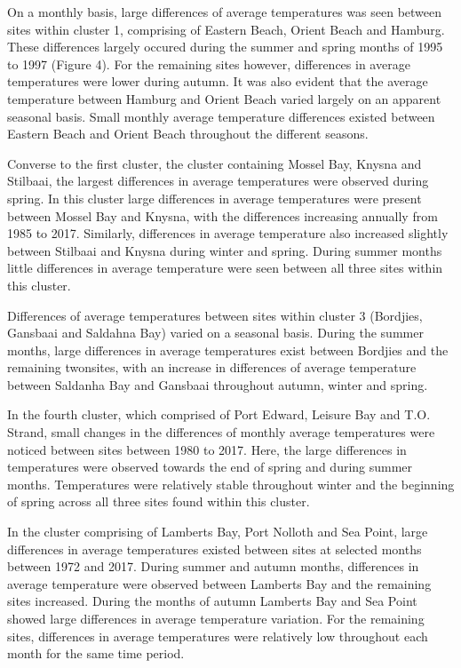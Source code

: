 \documentclass[12pt,A4paper,]{article}
\begin{document}
On a monthly basis, large differences of average temperatures was seen
between sites within cluster 1, comprising of Eastern Beach, Orient
Beach and Hamburg. These differences largely occured during the summer
and spring months of 1995 to 1997 (Figure 4). For the remaining sites
however, differences in average temperatures were lower during autumn.
It was also evident that the average temperature between Hamburg and
Orient Beach varied largely on an apparent seasonal basis. Small monthly
average temperature differences existed between Eastern Beach and Orient
Beach throughout the different seasons.

Converse to the first cluster, the cluster containing Mossel Bay, Knysna
and Stilbaai, the largest differences in average temperatures were
observed during spring. In this cluster large differences in average
temperatures were present between Mossel Bay and Knysna, with the
differences increasing annually from 1985 to 2017. Similarly,
differences in average temperature also increased slightly between
Stilbaai and Knysna during winter and spring. During summer months
little differences in average temperature were seen between all three
sites within this cluster.

Differences of average temperatures between sites within cluster 3
(Bordjies, Gansbaai and Saldahna Bay) varied on a seasonal basis. During
the summer months, large differences in average temperatures exist
between Bordjies and the remaining twonsites, with an increase in
differences of average temperature between Saldanha Bay and Gansbaai
throughout autumn, winter and spring.

In the fourth cluster, which comprised of Port Edward, Leisure Bay and
T.O. Strand, small changes in the differences of monthly average
temperatures were noticed between sites between 1980 to 2017. Here, the
large differences in temperatures were observed towards the end of
spring and during summer months. Temperatures were relatively stable
throughout winter and the beginning of spring across all three sites
found within this cluster.

In the cluster comprising of Lamberts Bay, Port Nolloth and Sea Point,
large differences in average temperatures existed between sites at
selected months between 1972 and 2017. During summer and autumn months,
differences in average temperature were observed between Lamberts Bay
and the remaining sites increased. During the months of autumn Lamberts
Bay and Sea Point showed large differences in average temperature
variation. For the remaining sites, differences in average temperatures
were relatively low throughout each month for the same time period.
\end{document}

